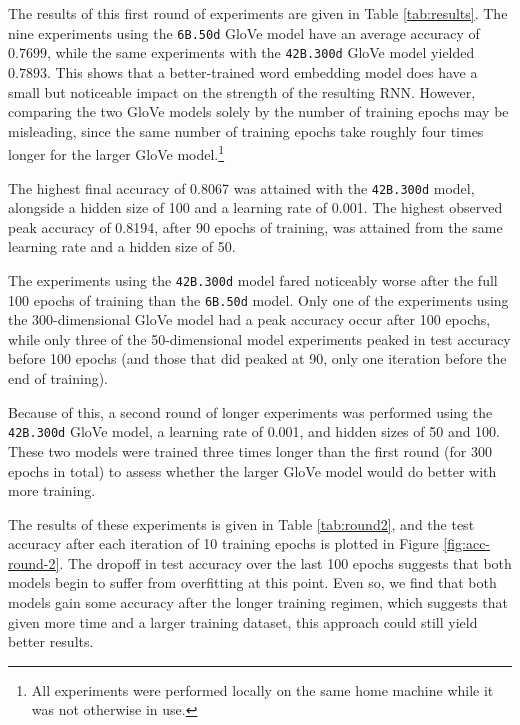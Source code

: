 \documentclass[12pt,letterpaper]{article}
\begin{document}


The results of this first round of experiments are given in Table \ref{tab:results}. The nine experiments using the \texttt{6B.50d} GloVe model have an average accuracy of $0.7699$, while the same experiments with the \texttt{42B.300d} GloVe model yielded $0.7893$. This shows that a better-trained word embedding model does have a small but noticeable impact on the strength of the resulting RNN. However, comparing the two GloVe models solely by the number of training epochs may be misleading, since the same number of training epochs take roughly four times longer for the larger GloVe model.\footnote{All experiments were performed locally on the same home machine while it was not otherwise in use.}

The highest final accuracy of 0.8067 was attained with the \texttt{42B.300d} model, alongside a hidden size of 100 and a learning rate of 0.001. The highest observed peak accuracy of 0.8194, after 90 epochs of training, was attained from the same learning rate and a hidden size of 50.

The experiments using the \texttt{42B.300d} model fared noticeably worse after the full 100 epochs of training than the \texttt{6B.50d} model. Only one of the experiments using the 300-dimensional GloVe model had a peak accuracy occur after 100 epochs, while only three of the 50-dimensional model experiments peaked in test accuracy before 100 epochs (and those that did peaked at 90, only one iteration before the end of training).

Because of this, a second round of longer experiments was performed using the \texttt{42B.300d} GloVe model, a learning rate of 0.001, and hidden sizes of 50 and 100. These two models were trained three times longer than the first round (for 300 epochs in total) to assess whether the larger GloVe model would do better with more training. 

The results of these experiments is given in Table \ref{tab:round2}, and the test accuracy after each iteration of 10 training epochs is plotted in Figure \ref{fig:acc-round-2}. The dropoff in test accuracy over the last 100 epochs suggests that both models begin to suffer from overfitting at this point. Even so, we find that both models gain some accuracy after the longer training regimen, which suggests that given more time and a larger training dataset, this approach could still yield better results.


\end{document}
